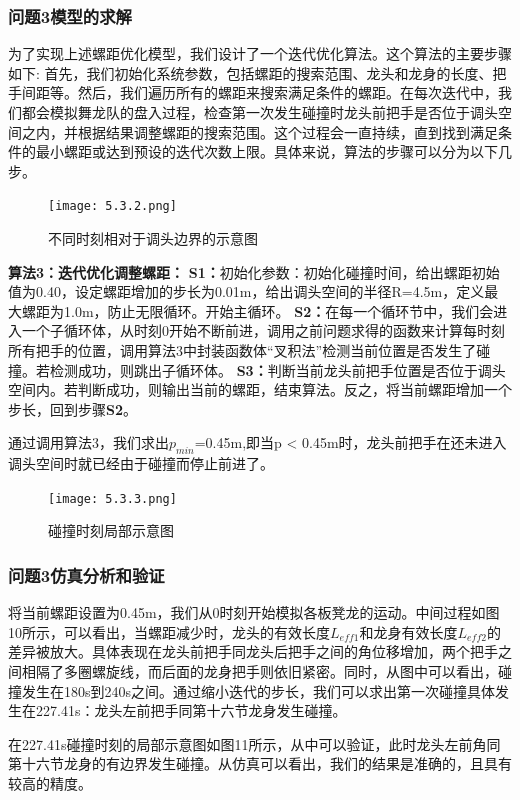 \documentclass{cumcmthesis1}
\begin{document}
\subsubsection{\textbf{问题3}模型的求解}
为了实现上述螺距优化模型，我们设计了一个迭代优化算法。这个算法的主要步骤如下:
首先，我们初始化系统参数，包括螺距的搜索范围、龙头和龙身的长度、把手间距等。然后，我们遍历所有的螺距来搜索满足条件的螺距。在每次迭代中，我们都会模拟舞龙队的盘入过程，检查第一次发生碰撞时龙头前把手是否位于调头空间之内，并根据结果调整螺距的搜索范围。这个过程会一直持续，直到找到满足条件的最小螺距或达到预设的迭代次数上限。具体来说，算法的步骤可以分为以下几步。
\par
\begin{figure}
    \caption{不同时刻相对于调头边界的示意图}
    \centering    
    \texttt{[image: 5.3.2.png]}
\end{figure}
\par
\textbf{算法3：迭代优化调整螺距：}
\newline
\noindent
\textbf{S1：}初始化参数：初始化碰撞时间，给出螺距初始值为0.40，设定螺距增加的步长为0.01m，给出调头空间的半径R=4.5m，定义最大螺距为1.0m，防止无限循环。开始主循环。
\newline
\noindent
\textbf{S2：}在每一个循环节中，我们会进入一个子循环体，从时刻0开始不断前进，调用之前问题求得的函数来计算每时刻所有把手的位置，调用算法3中封装函数体“叉积法”检测当前位置是否发生了碰撞。若检测成功，则跳出子循环体。
\newline
\noindent
\textbf{S3：}判断当前龙头前把手位置是否位于调头空间内。若判断成功，则输出当前的螺距，结束算法。反之，将当前螺距增加一个步长，回到步骤\textbf{S2}。
\par
通过调用算法3，我们求出$p_{min}$=0.45m,即当p < 0.45m时，龙头前把手在还未进入调头空间时就已经由于碰撞而停止前进了。

\par

\begin{figure}
    \caption{碰撞时刻局部示意图}
    \centering    
    \texttt{[image: 5.3.3.png]}
\end{figure}
\par
\subsubsection{\textbf{问题3}仿真分析和验证}
将当前螺距设置为0.45m，我们从0时刻开始模拟各板凳龙的运动。中间过程如图10所示，可以看出，当螺距减少时，龙头的有效长度$L_{eff1}$和龙身有效长度$L_{eff2}$的差异被放大。具体表现在龙头前把手同龙头后把手之间的角位移增加，两个把手之间相隔了多圈螺旋线，而后面的龙身把手则依旧紧密。同时，从图中可以看出，碰撞发生在180s到240s之间。通过缩小迭代的步长，我们可以求出第一次碰撞具体发生在227.41s：龙头左前把手同第十六节龙身发生碰撞。
\par
在227.41s碰撞时刻的局部示意图如图11所示，从中可以验证，此时龙头左前角同第十六节龙身的有边界发生碰撞。从仿真可以看出，我们的结果是准确的，且具有较高的精度。
\end{document}
